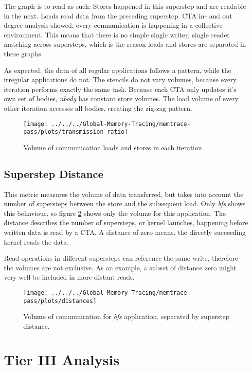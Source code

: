 The graph is to read as such: Stores happened in this superstep and are readable in the next. Loads read data from the preceding superstep. CTA in- and out degree analysis showed, every communication is happening in a collective environment. This means that there is no simple single writer, single reader matching across supersteps, which is the reason loads and stores are separated in these graphs.

As expected, the data of all regular applications follows a pattern, while the  irregular applications do not. The stencils do not
vary volumes, because every iteration performs exactly the same task. Because each CTA only updates
it's own set of bodies, \textit{nbody} has constant store volumes. The load volume of every other iteration accesses all bodies, creating the zig-zag pattern.
\begin{figure}[h!]
	\centering
	\texttt{[image: ../../../Global-Memory-Tracing/memtrace-pass/plots/transmission-ratio]}
	\caption{Volume of communication loads and stores in each iteration}
	\label{trans-ratio}
\end{figure}
\subsection{Superstep Distance}
This metric measures the volume of data transferred, but takes into account the number of supersteps between the store and the subsequent load. Only \textit{bfs} shows this behaviour, so
figure \ref{trans-distance} shows only the volume for this application. The distance describes the number
of supersteps, or kernel launches, happening before written data is read by a CTA. A distance of zero means, the directly succeeding kernel reads the data.

Read operations in different supersteps can reference the same write, therefore the volumes are not exclusive.
As an example, a subset of distance zero might very well be included in more distant reads.
\begin{figure}[t]
	\centering
	\texttt{[image: ../../../Global-Memory-Tracing/memtrace-pass/plots/distances]}
	\caption{Volume of communication for \textit{bfs} application, separated by superstep distance.}
	\label{trans-distance}
\end{figure}
\section{Tier III Analysis}


